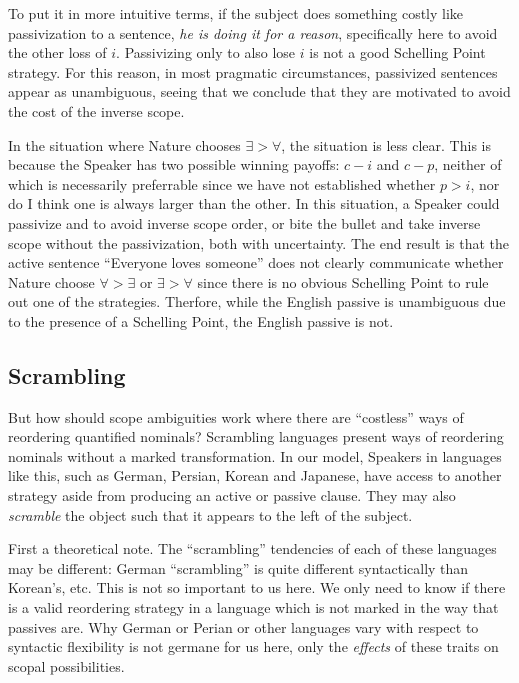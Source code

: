 \documentclass{article}
\begin{document}
\begin{exe}
\end{exe}

To put it in more intuitive terms, if the subject does something costly like passivization to a sentence, \emph{he is doing it for a reason}, specifically here to avoid the other loss of $i$.
Passivizing only to also lose $i$ is not a good Schelling Point strategy.
For this reason, in most pragmatic circumstances, passivized sentences appear as unambiguous, seeing that we conclude that they are motivated to avoid the cost of the inverse scope.

In the situation where Nature chooses ${\exists}>{\forall}$, the situation is less clear.
This is because the Speaker has two possible winning payoffs: $c-i$ and $c-p$, neither of which is necessarily preferrable since we have not established whether $p>i$, nor do I think one is always larger than the other.
In this situation, a Speaker could passivize and to avoid inverse scope order, or bite the bullet and take inverse scope without the passivization, both with uncertainty.
The end result is that the active sentence ``Everyone loves someone'' does not clearly communicate whether Nature choose ${\forall}>{\exists}$ or ${\exists}>{\forall}$ since there is no obvious Schelling Point to rule out one of the strategies. Therfore, while the English passive is unambiguous due to the presence of a Schelling Point, the English passive is not.

\subsection{Scrambling\label{scramb}}

But how should scope ambiguities work where there are ``costless'' ways of reordering quantified nominals? Scrambling languages present ways of reordering nominals without a marked transformation. In our model, Speakers in languages like this, such as German, Persian, Korean and Japanese, have access to another strategy aside from producing an active or passive clause. They may also \emph{scramble} the object such that it appears to the left of the subject.

First a theoretical note.
The ``scrambling'' tendencies of each of these languages may be different: German ``scrambling'' is quite different syntactically than Korean's, etc.
This is not so important to us here.
We only need to know if there is a valid reordering strategy in a language which is not marked in the way that passives are.
Why German or Perian or other languages vary with respect to syntactic flexibility is not germane for us here, only the \emph{effects} of these traits on scopal possibilities.
\end{document}
